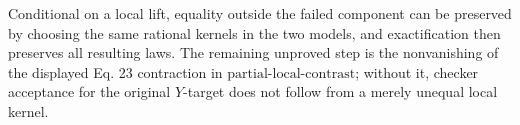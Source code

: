 Conditional on a local lift, equality outside the failed component can be preserved by choosing the same rational kernels in the two models, and exactification then preserves all resulting laws.  The remaining unproved step is the nonvanishing of the displayed Eq. 23 contraction in \(\mathrm{partial\text{-}local\text{-}contrast}\); without it, checker acceptance for the original \(Y\)-target does not follow from a merely unequal local kernel.